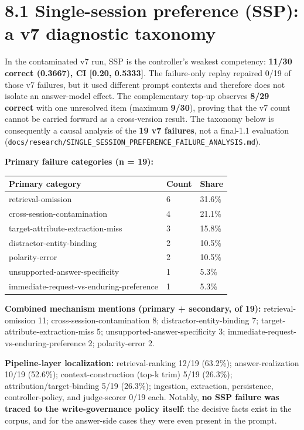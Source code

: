 \section{8.1 Single-session preference (SSP): a v7 diagnostic
taxonomy}\label{single-session-preference-ssp-a-v7-diagnostic-taxonomy}

In the contaminated v7 run, SSP is the controller's weakest competency:
\textbf{11/30 correct (0.3667), CI {[}0.20, 0.5333{]}}. The failure-only
replay repaired 0/19 of those v7 failures, but it used different prompt
contexts and therefore does not isolate an answer-model effect. The
complementary top-up observes \textbf{8/29 correct} with one unresolved
item (maximum \textbf{9/30}), proving that the v7 count cannot be
carried forward as a cross-version result. The taxonomy below is
consequently a causal analysis of the \textbf{19 v7 failures}, not a
final-1.1 evaluation
(\texttt{docs/research/SINGLE\_SESSION\_PREFERENCE\_FAILURE\_ANALYSIS.md}).

\textbf{Primary failure categories (n = 19):}

{\def\LTcaptype{none} %
\begin{longtable}[]{@{}lll@{}}
\toprule\noalign{}
Primary category & Count & Share \\
\midrule\noalign{}
\endhead
\bottomrule\noalign{}
\endlastfoot
retrieval-omission & 6 & 31.6\% \\
cross-session-contamination & 4 & 21.1\% \\
target-attribute-extraction-miss & 3 & 15.8\% \\
distractor-entity-binding & 2 & 10.5\% \\
polarity-error & 2 & 10.5\% \\
unsupported-answer-specificity & 1 & 5.3\% \\
immediate-request-vs-enduring-preference & 1 & 5.3\% \\
\end{longtable}
}

\textbf{Combined mechanism mentions (primary + secondary, of 19):}
retrieval-omission 11; cross-session-contamination 8;
distractor-entity-binding 7; target-attribute-extraction-miss 5;
unsupported-answer-specificity 3;
immediate-request-vs-enduring-preference 2; polarity-error 2.

\textbf{Pipeline-layer localization:} retrieval-ranking 12/19 (63.2\%);
answer-realization 10/19 (52.6\%); context-construction (top-k trim)
5/19 (26.3\%); attribution/target-binding 5/19 (26.3\%); ingestion,
extraction, persistence, controller-policy, and judge-scorer 0/19 each.
Notably, \textbf{no SSP failure was traced to the write-governance
policy itself}: the decisive facts exist in the corpus, and for the
answer-side cases they were even present in the prompt.

